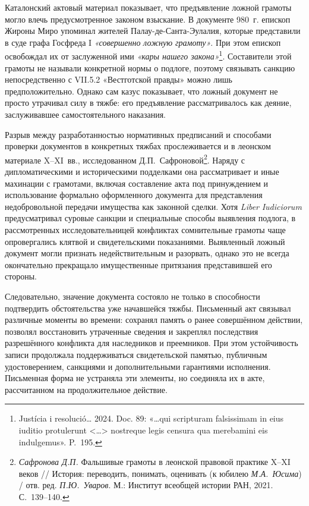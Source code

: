 Каталонский актовый материал показывает, что предъявление ложной грамоты могло влечь предусмотренное законом взыскание. В документе 980~г. епископ Жироны Миро упоминал жителей Палау-де-Санта-Эулалия, которые представили в суде графа Госфреда I \emph{«совершенно }\emph{ложную грамоту»}. При этом епископ освобождал их от заслуженной ими \emph{«кары нашего закона»}\footnote{Justícia i resolució… 2024. Doc. 89: «…qui scripturam falsissimam in eius iuditio protulerunt <…> nostreque legis censura qua merebamini eis indulgemus». P.~195.}. Составители этой грамоты не называли конкретной нормы о подлоге, поэтому связывать санкцию непосредственно с VII.5.2 «Вестготской правды» можно лишь предположительно. Однако сам казус показывает, что ложный документ не просто утрачивал силу в тяжбе: его предъявление рассматривалось как деяние, заслуживавшее самостоятельного наказания.

Разрыв между разработанностью нормативных предписаний и способами проверки документов в конкретных тяжбах прослеживается и в леонском материале X--XI~вв., исследованном Д.П.~Сафроновой\footnote{\emph{Сафронова Д.П.} Фальшивые грамоты в леонской правовой практике X--XI веков // История: переводить, понимать, оценивать (к юбилею \emph{М.А.~Юсима}) / отв. ред. \emph{П.Ю.~Уваров}. М.: Институт всеобщей истории РАН, 2021. С.~139--140.}. Наряду с дипломатическими и историческими подделками она рассматривает и иные махинации с грамотами, включая составление акта под принуждением и использование формально оформленного документа для представления недобровольной передачи имущества как законной сделки. Хотя \emph{Liber}\emph{ }\emph{Iudiciorum} предусматривал суровые санкции и специальные способы выявления подлога, в рассмотренных исследовательницей конфликтах сомнительные грамоты чаще опровергались клятвой и свидетельскими показаниями. Выявленный ложный документ могли признать недействительным и разорвать, однако это не всегда окончательно прекращало имущественные притязания представившей его стороны.

Следовательно, значение документа состояло не только в способности подтвердить обстоятельства уже начавшейся тяжбы. Письменный акт связывал различные моменты во времени: сохранял память о ранее совершённом действии, позволял восстановить утраченные сведения и закреплял последствия разрешённого конфликта для наследников и преемников. При этом устойчивость записи продолжала поддерживаться свидетельской памятью, публичным удостоверением, санкциями и дополнительными гарантиями исполнения. Письменная форма не устраняла эти элементы, но соединяла их в акте, рассчитанном на продолжительное действие.

